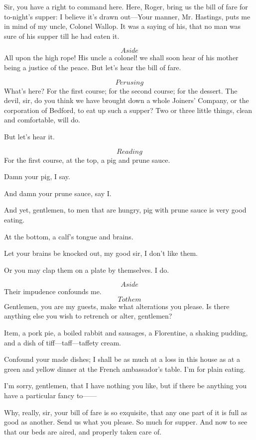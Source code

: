 \documentclass{book}
\begin{document}
\3  Sir, you have a right to command here.  Here, Roger,
bring us the bill of fare for to-night's supper: I believe it's drawn
out---Your manner, Mr. Hastings, puts me in mind of my uncle, Colonel
Wallop.  It was a saying of his, that no man was sure of his supper
till he had eaten it.

\4  \[Aside\]  All upon the high rope!  His uncle a colonel! we
shall soon hear of his mother being a justice of the peace.  But let's
hear the bill of fare.

\2  \[Perusing\]  What's here?  For the first course; for the
second course; for the dessert.  The devil, sir, do you think we have
brought down a whole Joiners' Company, or the corporation of Bedford,
to eat up such a supper?  Two or three little things, clean and
comfortable, will do.

\4  But let's hear it.

\2  \[Reading\]  For the first course, at the top, a pig and prune
sauce.

\4  Damn your pig, I say.

\2  And damn your prune sauce, say I.

\3  And yet, gentlemen, to men that are hungry, pig with
prune sauce is very good eating.

\2  At the bottom, a calf's tongue and brains.

\4  Let your brains be knocked out, my good sir, I don't like
them.

\2  Or you may clap them on a plate by themselves.  I do.

\3  \[Aside\]  Their impudence confounds me.  \[To them\] 
Gentlemen, you are my guests, make what alterations you please.  Is
there anything else you wish to retrench or alter, gentlemen?

\2  Item, a pork pie, a boiled rabbit and sausages, a Florentine,
a shaking pudding, and a dish of tiff---taff---taffety cream.

\4  Confound your made dishes; I shall be as much at a loss in
this house as at a green and yellow dinner at the French ambassador's
table.  I'm for plain eating.

\3  I'm sorry, gentlemen, that I have nothing you like, but if
there be anything you have a particular fancy to------

\2  Why, really, sir, your bill of fare is so exquisite, that any
one part of it is full as good as another.  Send us what you please. 
So much for supper.  And now to see that our beds are aired, and
properly taken care of.
\end{document}
